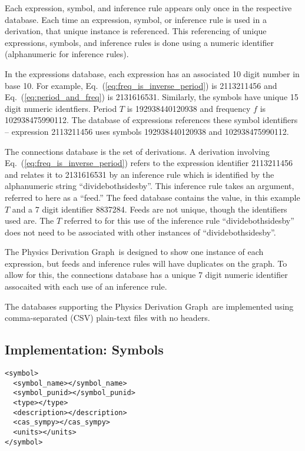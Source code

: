 \documentclass{article}
\newcommand{\eqn}[1]{Eq.\ (\ref{#1})}
\newcommand{\pdg}{Physics Derivation Graph}
\begin{document}
\begin{multicols}{2}
Each expression, symbol, and inference rule appears only once in the respective database. Each time an expression, symbol, or inference rule is used in a derivation, that unique instance is referenced. This referencing of unique expressions, symbols, and inference rules is done using a numeric identifier (alphanumeric for inference rules).

In the expressions database, each expression has an associated 10 digit number in base 10. For example, \eqn{eq:freq_is_inverse_period} is 2113211456 and \eqn{eq:period_and_freq} is 2131616531. Similarly, the symbols have unique 15 digit numeric identfiers. Period $T$ is 192938440120938 and frequency $f$ is 102938475990112. The database of expressions references these symbol identifiers -- expression 2113211456 uses symbols 192938440120938 and 102938475990112. 

The connections database is the set of derivations. A derivation involving \eqn{eq:freq_is_inverse_period} refers to the expression identifier 2113211456 and relates it to 2131616531 by an inference rule which is identified by the alphanumeric string ``dividebothsidesby''. This inference rule takes an argument, referred to here as a ``feed.'' The feed database contains the value, in this example $T$ and a 7 digit identifier 8837284. Feeds are not unique, though the identifiers used are. The $T$ referred to for this use of the inference rule ``dividebothsidesby'' does not need to be associated with other instances of ``dividebothsidesby''. 

The \pdg\ is designed to show one instance of each expression, but feeds and inference rules will have duplicates on the graph. To allow for this, the connections database has a unique 7 digit numeric identifier assocaited with each use of an inference rule. 

The databases supporting the \pdg\ are implemented using comma-separated (CSV) plain-text files with no headers. 

\subsection{Implementation: Symbols\label{sec:symbols}}

\begin{verbatim}
<symbol>
  <symbol_name></symbol_name>
  <symbol_punid></symbol_punid>
  <type></type>
  <description></description>
  <cas_sympy></cas_sympy>
  <units></units>
</symbol>
\end{verbatim}


\end{multicols}
\end{document}
